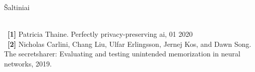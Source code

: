 \begin{frame}[c]{Šaltiniai}
 
\\\ \textbf{[1]} Patricia Thaine. Perfectly privacy-preserving ai, 01 2020 
\\\ \textbf{[2]} Nicholas Carlini, Chang Liu, Ulfar Erlingsson, Jernej Kos, and Dawn Song.   The secretsharer: Evaluating and testing unintended memorization in neural networks, 2019.

\end{frame}